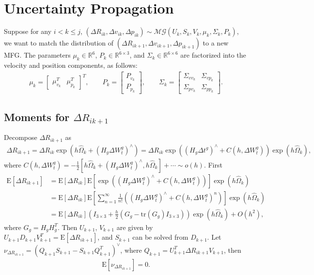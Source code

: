 \documentclass[10pt]{article}
\newcommand{\tr}[1]{\ensuremath{\mathrm{tr}\left( #1 \right)}}
\newcommand{\expect}[1]{\ensuremath{\mathrm{E}\left[ #1 \right]}}
\newcommand{\real}[1]{\ensuremath{\mathbb{R}^{ #1 }}}
\begin{document}
\section{Uncertainty Propagation}
Suppose for any $i < k \leq j$, $(\Delta R_{ik}, \Delta v_{ik}, \Delta p_{ik}) \sim \mathcal{MG}(U_k,S_k,V_k,\mu_k,\Sigma_k,P_k)$, we want to match the distribution of $(\Delta R_{ik+1}, \Delta v_{ik+1}, \Delta p_{ik+1})$ to a new MFG.
The parameters $\mu_k\in\real{6}$, $P_k\in\real{6\times 3}$, and $\Sigma_k\in\real{6\times 6}$ are factorized into the velocity and position components, as follows:
\begin{gather}
	\mu_k = \begin{bmatrix} \mu_{v_k}^T & \mu_{p_k}^T \end{bmatrix}^T, \qquad
	P_k = \begin{bmatrix} P_{v_k} \\ P_{p_k} \end{bmatrix}, \qquad 
	\Sigma_k = \begin{bmatrix} \Sigma_{vv_k} & \Sigma_{vp_k} \\ \Sigma_{pv_k} & \Sigma_{pp_k} \end{bmatrix}.
\end{gather}

\subsection{Moments for $\Delta R_{ik+1}$}
Decompose $\Delta R_{ik+1}$ as
\begin{align*}
	\Delta R_{ik+1} = \Delta R_{ik} \exp(h\hat{\Omega}_k + (H_g\Delta W_t^g)^\wedge) = \Delta R_{ik} \exp((H_g\Delta t^g)^\wedge + C(h,\Delta W_t^g)) \exp(h\hat{\Omega}_k),
\end{align*}
where $C(h,\Delta W_t^g) = -\frac{1}{2}[h\hat{\Omega}_k+(H_g\Delta W_t^g)^\wedge, h\hat{\Omega}_k] + \cdots \sim o(h)$.
First
\color{blue}
\begin{align}
	\expect{\Delta R_{ik+1}} &= \expect{\Delta R_{ik}} \expect{\exp\left( (H_g\Delta W_t^g)^\wedge + C(h,\Delta W_t^g) \right)} \exp(h\hat{\Omega}_k) \nonumber \\
	&= \expect{\Delta R_{ik}} \expect{ \sum_{n=1}^\infty \tfrac{1}{n!} \left( (H_g\Delta W_t^g)^\wedge + C(h,\Delta W_t^g)^n \right) } \exp(h\hat{\Omega}_k) \nonumber \\
	&= \expect{\Delta R_{ik}} \left( I_{3\times 3} + \tfrac{h}{2}(G_g-\tr{G_g}I_{3\times 3}) \right) \exp(h\hat{\Omega}_k) + O(h^2),
\end{align}
\color{black}
where $G_g = H_gH_g^T$.
Then $U_{k+1}$, $V_{k+1}$ are given by $U_{k+1}D_{k+1}V_{k+1}^T = \expect{\Delta R_{ik+1}}$, and $S_{k+1}$ can be solved from $D_{k+1}$.
Let $\nu_{\Delta R_{ik+1}} = (Q_{k+1}S_{k+1} - S_{k+1}Q_{k+1}^T)^\vee$, where $Q_{k+1} = U_{k+1}^T \Delta R_{ik+1} V_{k+1}$, then
\color{blue}
\begin{align}
	\expect{\nu_{\Delta R_{ik+1}}} = 0.
\end{align}
\color{black}
\end{document}
